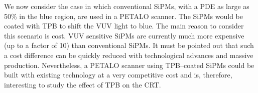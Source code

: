 \documentclass[review]{elsarticle}
\begin{document}
%
%


We now consider the case in which conventional SiPMs, with a PDE as large as 50\% in the blue region, are used in a PETALO scanner. The SiPMs would be coated with TPB to shift the VUV light to blue. The main reason to consider this scenario is cost. VUV sensitive SiPMs are currently much more expensive (up to a factor of 10) than conventional SiPMs. It must be pointed out that such a cost difference can be quickly reduced with technological advances and massive production. Nevertheless, a PETALO scanner using TPB--coated SiPMs could be built with existing technology at a very competitive cost and is, therefore, interesting to study the effect of TPB on the CRT.
\end{document}
